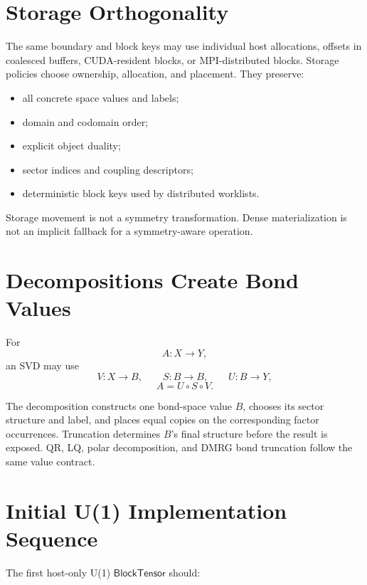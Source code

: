 \documentclass[11pt]{article}
\newcommand{\BlockTensor}{\mathsf{BlockTensor}}
\begin{document}
\section{Storage Orthogonality}

The same boundary and block keys may use individual host allocations,
offsets in coalesced buffers, CUDA-resident blocks, or MPI-distributed
blocks.  Storage policies choose ownership, allocation, and placement.
They preserve:

\begin{itemize}[nosep]
  \item all concrete space values and labels;
  \item domain and codomain order;
  \item explicit object duality;
  \item sector indices and coupling descriptors;
  \item deterministic block keys used by distributed worklists.
\end{itemize}

Storage movement is not a symmetry transformation.  Dense
materialization is not an implicit fallback for a symmetry-aware
operation.

\section{Decompositions Create Bond Values}

For
\[
  A:X\longrightarrow Y,
\]
an SVD may use
\[
  V:X\longrightarrow B,\qquad
  S:B\longrightarrow B,\qquad
  U:B\longrightarrow Y,
\]
\[
  A=U\circ S\circ V.
\]

The decomposition constructs one bond-space value \(B\), chooses its
sector structure and label, and places equal copies on the
corresponding factor occurrences.  Truncation determines \(B\)'s final
structure before the result is exposed.  QR, LQ, polar decomposition,
and DMRG bond truncation follow the same value contract.

\section{Initial U(1) Implementation Sequence}

The first host-only U(1) \(\BlockTensor\) should:
\end{document}
